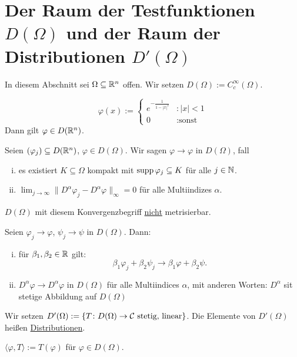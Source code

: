 \section{Der Raum der Testfunktionen $D(\Omega)$ und der Raum der Distributionen $D'(\Omega)$}

In diesem Abschnitt sei $\Omega \subseteq \mathbb{R}^n$ offen.
Wir setzen $D(\Omega) := C_c^\infty(\Omega)$.

\begin{ex}
  $$
  \varphi(x) := \begin{cases} e^{-\frac{1}{1 - |x|^2}} &\colon |x| < 1 \\
    0 &\colon \text{sonst}
  \end{cases} 
  $$
  Dann gilt $\varphi \in D(\mathbb{R}^n)$.
\end{ex}

\begin{defn}
Seien $(\varphi_j) \subseteq D(\mathbb{R}^n)$, $\varphi \in D(\Omega)$.
Wir sagen $\varphi \to \varphi$ in $D(\Omega)$, fall
\begin{enumerate}[i)]
  \item es existiert $K \subseteq \Omega$ kompakt mit $\operatorname{supp} \varphi_j \subseteq K$ für alle $j \in \mathbb{N}$.
  \item $\lim_{j \to \infty} \| D^\alpha \varphi_j - D^\alpha \varphi \|_{\infty} = 0$ für alle Multiindizes $\alpha$.
\end{enumerate}
\end{defn}

\begin{bem}
  $D(\Omega)$ mit diesem Konvergenzbegriff \underline{nicht} metrisierbar. 
\end{bem}

\begin{thm}
  Seien $\varphi_j \to \varphi$, $\psi_j \to \psi$ in $D(\Omega)$. Dann:
  \begin{enumerate}[i)]
  \item für $\beta_1, \beta_2 \in \mathbb{R}$ gilt: 
    $$\beta_1 \varphi_j + \beta_2 \psi_j 
    \to \beta_1 \varphi + \beta_2 \psi.
    $$
  \item $D^\alpha \varphi \to D^\alpha \varphi$ in $D(\Omega)$ für alle Multiindices $\alpha$, mit anderen Worten: $D^\alpha$ sit stetige Abbildung auf $D(\Omega)$
  \end{enumerate}
\end{thm}

\begin{defn}
  Wir setzen $D'(\Omega) := \{T \colon D(\Omega) \to \mathcal{C} \text{ stetig, linear} \}$.
  Die Elemente von $D'(\Omega)$ heißen \underline{Distributionen}.
\end{defn}

\begin{ntion}
  $\langle \varphi, T\rangle := T(\varphi)$ für $\varphi \in D(\Omega)$.
\end{ntion}


